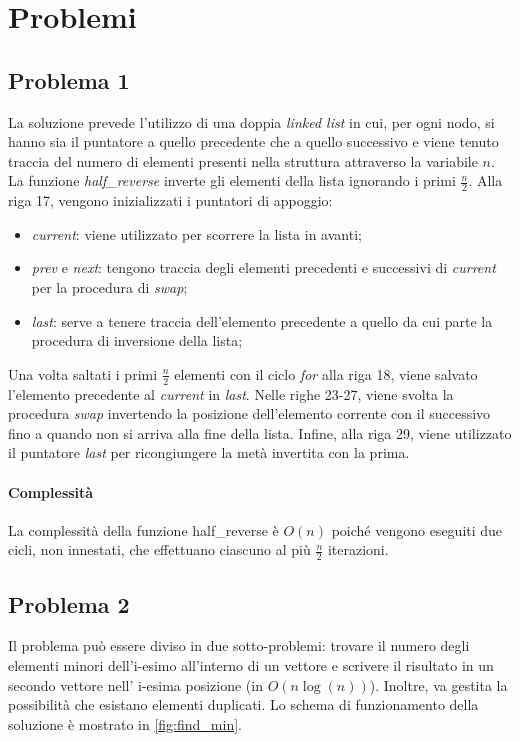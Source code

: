 \documentclass{article}
\begin{document}
\section{Problemi}

\subsection{Problema 1}

La soluzione prevede l'utilizzo di una doppia \textit{linked list} in cui, per ogni nodo, si hanno sia il puntatore a quello precedente che a quello successivo e viene tenuto traccia del numero di elementi presenti nella struttura attraverso la variabile $n$. La funzione \textit{half\_reverse} inverte gli elementi della lista ignorando i primi $\frac{n}{2}$.
Alla riga 17, vengono inizializzati i puntatori di appoggio:
\begin{itemize}
    \item \textit{current}: viene utilizzato per scorrere la lista in avanti;
    \item \textit{prev} e \textit{next}: tengono traccia degli elementi precedenti e successivi di \textit{current} per la procedura di \textit{swap};
    \item \textit{last}: serve a tenere traccia dell'elemento precedente a quello da cui parte la procedura di inversione della lista;
\end{itemize}

Una volta saltati i primi $\frac{n}{2}$ elementi con il ciclo \textit{for} alla riga 18, viene salvato l'elemento precedente al \textit{current} in \textit{last}. Nelle righe 23-27, viene svolta la procedura \textit{swap} invertendo la posizione dell'elemento corrente con il successivo fino a quando non si arriva alla fine della lista. Infine, alla riga 29, viene utilizzato il puntatore \textit{last} per ricongiungere la metà invertita con la prima.

\paragraph{Complessità}
La complessità della funzione half\_reverse è $O(n)$ poiché vengono eseguiti due cicli, non innestati, che effettuano ciascuno al più $\frac{n}{2}$ iterazioni.


\subsection{Problema 2}
Il problema può essere diviso in due sotto-problemi: trovare il numero degli elementi minori dell'i-esimo all'interno di un vettore e scrivere il risultato in un secondo vettore nell' i-esima posizione (in $O(n\log(n))$). Inoltre, va gestita la possibilità che esistano elementi duplicati. Lo schema di funzionamento della soluzione è mostrato in \cref{fig:find_min}.
\end{document}
